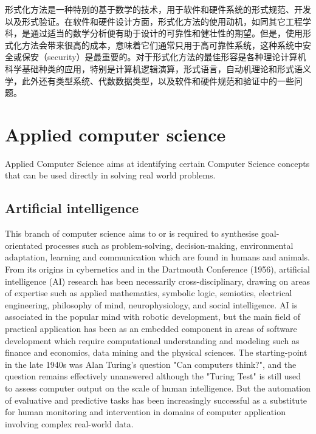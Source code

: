 形式化方法是一种特别的基于数学的技术，用于软件和硬件系统的形式规范、开发以及形式验证。在软件和硬件设计方面，形式化方法的使用动机，如同其它工程学科，是通过适当的数学分析便有助于设计的可靠性和健壮性的期望。但是，使用形式化方法会带来很高的成本，意味着它们通常只用于高可靠性系统，这种系统中安全或保安（security）是最重要的。对于形式化方法的最佳形容是各种理论计算机科学基础种类的应用，特别是计算机逻辑演算，形式语言，自动机理论和形式语义学，此外还有类型系统、代数数据类型，以及软件和硬件规范和验证中的一些问题。








\section{Applied computer science}

Applied Computer Science aims at identifying certain Computer Science concepts that can be used directly in solving real world problems.



\subsection{Artificial intelligence}



This branch of computer science aims to or is required to synthesise goal-orientated processes such as problem-solving, decision-making, environmental adaptation, learning and communication which are found in humans and animals. From its origins in cybernetics and in the Dartmouth Conference (1956), artificial intelligence (AI) research has been necessarily cross-disciplinary, drawing on areas of expertise such as applied mathematics, symbolic logic, semiotics, electrical engineering, philosophy of mind, neurophysiology, and social intelligence. AI is associated in the popular mind with robotic development, but the main field of practical application has been as an embedded component in areas of software development which require computational understanding and modeling such as finance and economics, data mining and the physical sciences. The starting-point in the late 1940s was Alan Turing's question "Can computers think?", and the question remains effectively unanswered although the "Turing Test" is still used to assess computer output on the scale of human intelligence. But the automation of evaluative and predictive tasks has been increasingly successful as a substitute for human monitoring and intervention in domains of computer application involving complex real-world data.


